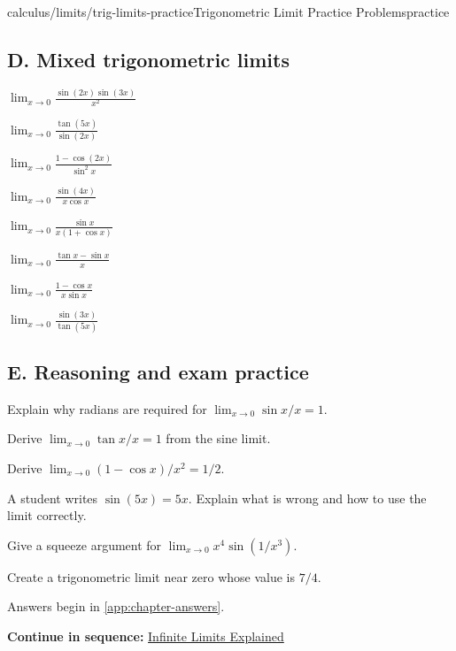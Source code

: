 \documentclass[11pt,openany]{book}
\theoremstyle{bgplain}
\newcommand{\webnext}[2]{%
  \par\addvspace{1.2em}\noindent{\color{BGLine}\rule{\textwidth}{0.35pt}}\par\smallskip
  {\small\color{BGGray}\textbf{Continue in sequence:} \hyperlink{web:#1}{#2}}\par
}
\begin{document}
\begin{webpage}{calculus/limits/trig-limits-practice}{Trigonometric Limit Practice Problems}{practice}
\subsection*{D. Mixed trigonometric limits}
\begin{bgexercises}[label=\textbf{3.\arabic*},resume]
  \item \(\displaystyle\lim_{x\to0}\frac{\sin(2x)\sin(3x)}{x^2}\)
  \item \(\displaystyle\lim_{x\to0}\frac{\tan(5x)}{\sin(2x)}\)
  \item \(\displaystyle\lim_{x\to0}\frac{1-\cos(2x)}{\sin^2x}\)
  \item \(\displaystyle\lim_{x\to0}\frac{\sin(4x)}{x\cos x}\)
  \item \(\displaystyle\lim_{x\to0}\frac{\sin x}{x(1+\cos x)}\)
  \item \(\displaystyle\lim_{x\to0}\frac{\tan x-\sin x}{x}\)
  \item \(\displaystyle\lim_{x\to0}\frac{1-\cos x}{x\sin x}\)
  \item \(\displaystyle\lim_{x\to0}\frac{\sin(3x)}{\tan(5x)}\)
\end{bgexercises}

\subsection*{E. Reasoning and exam practice}
\begin{bgexercises}[label=\textbf{3.\arabic*},resume]
  \item Explain why radians are required for \(\lim_{x\to0}\sin x/x=1\).
  \item Derive \(\lim_{x\to0}\tan x/x=1\) from the sine limit.
  \item Derive \(\lim_{x\to0}(1-\cos x)/x^2=1/2\).
  \item A student writes \(\sin(5x)=5x\). Explain what is wrong and how to use the limit correctly.
  \item Give a squeeze argument for \(\lim_{x\to0}x^4\sin(1/x^3)\).
  \item Create a trigonometric limit near zero whose value is \(7/4\).
\end{bgexercises}

Answers begin in \cref{app:chapter-answers}.
\webnext{calculus/limits/infinite-limits}{Infinite Limits Explained}
\end{webpage}


\end{document}
